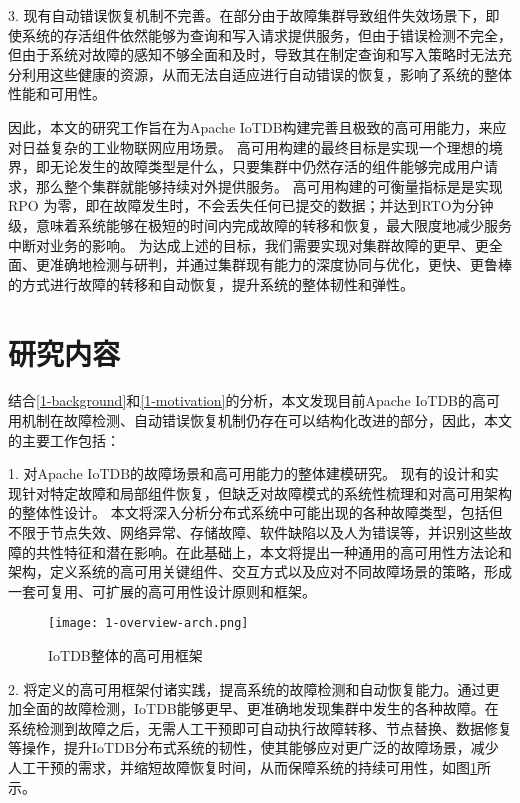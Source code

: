 3. 现有自动错误恢复机制不完善。在部分由于故障集群导致组件失效场景下，即使系统的存活组件依然能够为查询和写入请求提供服务，但由于错误检测不完全，但由于系统对故障的感知不够全面和及时，导致其在制定查询和写入策略时无法充分利用这些健康的资源，从而无法自适应进行自动错误的恢复，影响了系统的整体性能和可用性。

因此，本文的研究工作旨在为Apache IoTDB构建完善且极致的高可用能力，来应对日益复杂的工业物联网应用场景。
高可用构建的最终目标是实现一个理想的境界，即无论发生的故障类型是什么，只要集群中仍然存活的组件能够完成用户请求，那么整个集群就能够持续对外提供服务。
高可用构建的可衡量指标是是实现 RPO 为零，即在故障发生时，不会丢失任何已提交的数据；并达到RTO为分钟级，意味着系统能够在极短的时间内完成故障的转移和恢复，最大限度地减少服务中断对业务的影响。
为达成上述的目标，我们需要实现对集群故障的更早、更全面、更准确地检测与研判，并通过集群现有能力的深度协同与优化，更快、更鲁棒的方式进行故障的转移和自动恢复，提升系统的整体韧性和弹性。



\section{研究内容}

结合\ref{1-background}和\ref{1-motivation}的分析，本文发现目前Apache IoTDB的高可用机制在故障检测、自动错误恢复机制仍存在可以结构化改进的部分，因此，本文的主要工作包括：

1. 对Apache IoTDB的故障场景和高可用能力的整体建模研究。
现有的设计和实现针对特定故障和局部组件恢复，但缺乏对故障模式的系统性梳理和对高可用架构的整体性设计。
本文将深入分析分布式系统中可能出现的各种故障类型，包括但不限于节点失效、网络异常、存储故障、软件缺陷以及人为错误等，并识别这些故障的共性特征和潜在影响。在此基础上，本文将提出一种通用的高可用性方法论和架构，定义系统的高可用关键组件、交互方式以及应对不同故障场景的策略，形成一套可复用、可扩展的高可用性设计原则和框架。

\begin{figure}
  \centering
  \texttt{[image: 1-overview-arch.png]}
  \caption{IoTDB整体的高可用框架}
  \label{fig:c01-overview-arch}
\end{figure}

2. 将定义的高可用框架付诸实践，提高系统的故障检测和自动恢复能力。通过更加全面的故障检测，IoTDB能够更早、更准确地发现集群中发生的各种故障。在系统检测到故障之后，无需人工干预即可自动执行故障转移、节点替换、数据修复等操作，提升IoTDB分布式系统的韧性，使其能够应对更广泛的故障场景，减少人工干预的需求，并缩短故障恢复时间，从而保障系统的持续可用性，如图\ref{fig:c01-overview-arch}所示。


